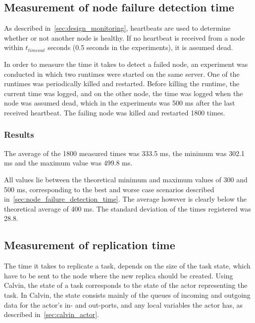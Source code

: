\documentclass{cslthse-msc}
\begin{document}
\subsection{Measurement of node failure detection time} \label{subsec:eval_node_fail_time}
As described in~\cref{sec:design_monitoring}, heartbeats are used to determine whether or not another node is healthy. If no heartbeat is received from a node within $t_{timeout}$ seconds (0.5 seconds in the experiments), it is assumed dead. 

In order to measure the time it takes to detect a failed node, an experiment was conducted in which two runtimes were started on the same server. One of the runtimes was periodically killed and restarted. Before killing the runtime, the current time was logged, and on the other node, the time was logged when the node was assumed dead, which in the experiments was 500 ms after the last received heartbeat. The failing node was killed and restarted 1800 times.

\subsubsection*{Results}
The average of the 1800 measured times was 333.5 ms, the minimum was 302.1 ms and the maximum value was 499.8 ms.

All values lie between the theoretical minimum and maximum values of 300 and 500 ms, corresponding to the best and worse case scenarios described in~\cref{sec:node_failure_detection_time}. The average however is clearly below the theoretical average of 400 ms. 
The standard deviation of the times registered was 28.8.

\subsection{Measurement of replication time} \label{sec:eval_repl_time}
The time it takes to replicate a task, depends on the size of the task state, which have to be sent to the node where the new replica should be created. Using Calvin, the state of a task corresponds to the state of the actor representing the task. In Calvin, the state consists mainly of the queues of incoming and outgoing data for the actor's in- and out-ports, and any local variables the actor has, as described in~\cref{sec:calvin_actor}.
\end{document}
